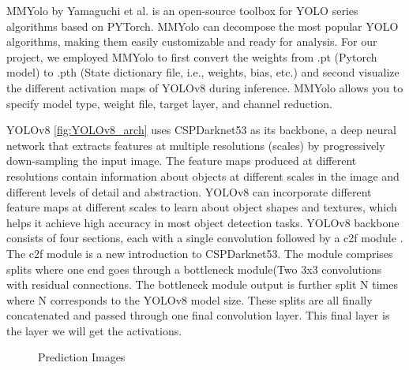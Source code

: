 \documentclass[10pt,twocolumn,letterpaper]{article}
\begin{document}
MMYolo \cite{MMYOLOViz} by Yamaguchi et al. is an open-source toolbox for YOLO series algorithms based on PYTorch. MMYolo can decompose the most popular YOLO algorithms, making them easily customizable and ready for analysis. For our project, we employed MMYolo to first convert the weights from .pt (Pytorch model) to .pth (State dictionary file, i.e., weights, bias, etc.) and second visualize the different activation maps of YOLOv8 during inference. MMYolo allows you to specify model type, weight file, target layer, and channel reduction.

YOLOv8 \ref{fig:YOLOv8_arch} uses CSPDarknet53 \cite{darkNet} as its backbone, a deep neural network that extracts features at multiple resolutions (scales) by progressively down-sampling the input image. The feature maps produced at different resolutions contain information about objects at different scales in the image and different levels of detail and abstraction. YOLOv8 can incorporate different feature maps at different scales to learn about object shapes and textures, which helps it achieve high accuracy in most object detection tasks. YOLOv8 backbone consists of four sections, each with a single convolution followed by a c2f module \cite{YOLOv8Website}. The c2f module is a new introduction to CSPDarknet53. The module comprises splits where one end goes through a bottleneck module(Two 3x3 convolutions with residual connections. The bottleneck module output is further split N times where N corresponds to the YOLOv8 model size. These splits are all finally concatenated and passed through one final convolution layer. This final layer is the layer we will get the activations.

\begin{figure}[h]
    \centering
    \hspace{0.1em}
    \centering    
    \caption{Prediction Images}%
    \label{fig:PredictionModel}
\end{figure}
\end{document}
